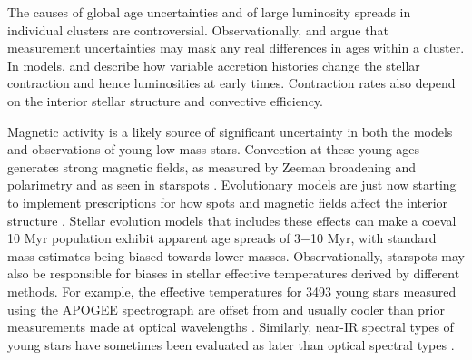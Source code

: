 \documentclass[twocolumn]{emulateapj}%
\begin{document}
The causes of global age uncertainties and of large luminosity spreads in individual clusters are controversial.  Observationally, \citet{hartmann01} and \citet{slesnick08} argue that measurement uncertainties may mask any real differences in ages within a cluster.  In models, \citet{hartmann97} and \citet{baraffe09} describe how variable accretion histories change the stellar contraction and hence luminosities at early times.  Contraction rates also depend on the interior stellar structure and convective efficiency.

Magnetic activity is a likely source of significant uncertainty in both the models and observations of young low-mass stars. Convection at these young ages generates strong magnetic fields, as measured by Zeeman broadening and polarimetry \citep[e.g.][]{johnskrull07,donati09} and as seen in starspots \citep[e.g.][]{stauffer03,grankin08}.  Evolutionary models are just now starting to implement prescriptions for how spots and magnetic fields affect the interior structure \citep{macdonald13,jackson14a,somers15,feiden16}.  Stellar evolution models that includes these effects can make a coeval 10 Myr population exhibit apparent age spreads of 3$-$10 Myr, with standard mass estimates being biased towards lower masses.  Observationally, starspots may also be responsible for biases in stellar effective temperatures derived by different methods.  For example, the effective temperatures for 3493 young stars measured using the APOGEE spectrograph \citep[$1.5-1.70 \;\mu$m at $R=22,500$][]{wilson10} are offset from and usually cooler than prior measurements made at optical wavelengths \citep{cottaar14}.  Similarly, near-IR spectral types of young stars have sometimes been evaluated as later than optical spectral types \citep{bouvier92,vacca11}.

\end{document}
